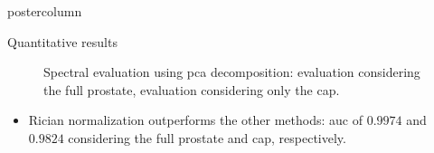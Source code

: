 \documentclass[final, size=a0]{beamer}
\begin{document}
\begin{frame}
\begin{columns}
\begin{column}{.33\textwidth}
\begin{beamercolorbox}[center,wd=\textwidth]{postercolumn}
\begin{minipage}[T]{.95\textwidth}
{            %
            \begin{block}{Quantitative results}
              \begin{figure}
                \centering
                \hfill
                \caption{Spectral evaluation using \ac{pca} decomposition: \protect{} evaluation considering the full prostate, \protect{} evaluation considering only the \ac{cap}.}
                \label{fig:qt}
              \end{figure}
              
              \begin{itemize}
              \justifying
              \item Rician normalization outperforms the other methods: \ac{auc} of $0.9974$ and $0.9824$ considering the full prostate and \ac{cap}, respectively.
              \end{itemize}

            \end{block}
            
}
\end{minipage}
\end{beamercolorbox}
\end{column}
\end{columns}
\end{frame}
\end{document}
